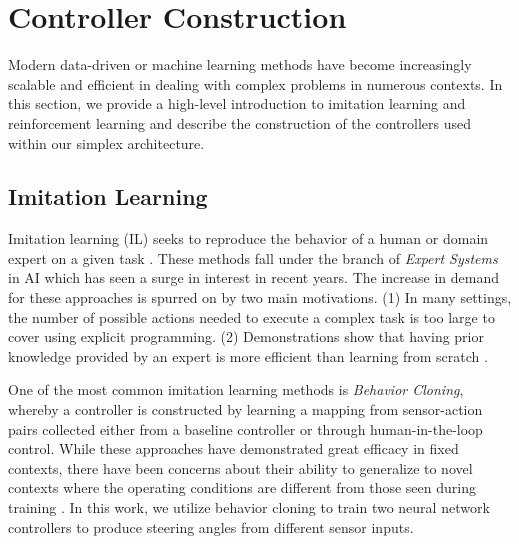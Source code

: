 \documentclass[manuscript,screen,review]{acmart}
\newcommand{\todo}[1]{\textcolor{red}{\textbf{\underline{TODO:}} #1}}
\begin{document}
\section{Controller Construction}

Modern data-driven or machine learning methods have become increasingly scalable and efficient in dealing with complex problems in numerous contexts. In this section, we provide a high-level introduction to imitation learning and reinforcement learning and describe the construction of the controllers used within our simplex architecture.

\subsection{Imitation Learning}

Imitation learning (IL) seeks to reproduce the behavior of a human or domain expert on a given task \cite{Hussein2017ImitationL}. These methods fall under the branch of \textit{Expert Systems} in AI which has seen a surge in interest in recent years. The increase in demand for these approaches is spurred on by two main motivations. (1) In many settings, the number of possible actions needed to execute a complex task is too large to cover using explicit programming. (2) Demonstrations show that having prior knowledge provided by an expert is more efficient than learning from scratch \cite{Hussein2017ImitationL}.

One of the most common imitation learning methods is \textit{Behavior Cloning}, whereby a controller is constructed by learning a mapping from sensor-action pairs collected either from a baseline controller or through human-in-the-loop control. While these approaches have demonstrated great efficacy in fixed contexts, there have been concerns about their ability to generalize to novel contexts where the operating conditions are different from those seen during training \cite{Majumdar2017}.
In this work, we utilize behavior cloning to train two neural network controllers to produce steering angles from different sensor inputs. %
\end{document}
